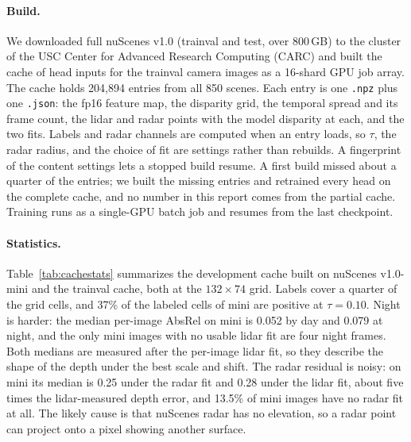\paragraph{Build.} We downloaded full nuScenes v1.0 (trainval and test, over 800\,GB) to the cluster of the USC Center for Advanced Research Computing (CARC) and built the cache of head inputs for the trainval camera images as a 16-shard GPU job array. The cache holds 204,894 entries from all 850 scenes. Each entry is one \texttt{.npz} plus one \texttt{.json}: the fp16 feature map, the disparity grid, the temporal spread and its frame count, the lidar and radar points with the model disparity at each, and the two fits. Labels and radar channels are computed when an entry loads, so $\tau$, the radar radius, and the choice of fit are settings rather than rebuilds. A fingerprint of the content settings lets a stopped build resume. A first build missed about a quarter of the entries; we built the missing entries and retrained every head on the complete cache, and no number in this report comes from the partial cache.  Training runs as a single-GPU batch job and resumes from the last checkpoint.

\paragraph{Statistics.} Table~\ref{tab:cachestats} summarizes the development cache built on nuScenes v1.0-mini and the trainval cache, both at the $132 \times 74$ grid. Labels cover a quarter of the grid cells, and 37\% of the labeled cells of mini are positive at $\tau = 0.10$. Night is harder: the median per-image AbsRel on mini is 0.052 by day and 0.079 at night, and the only mini images with no usable lidar fit are four night frames. Both medians are measured after the per-image lidar fit, so they describe the shape of the depth under the best scale and shift. The radar residual is noisy: on mini its median is 0.25 under the radar fit and 0.28 under the lidar fit, about five times the lidar-measured depth error, and 13.5\% of mini images have no radar fit at all. The likely cause is that nuScenes radar has no elevation, so a radar point can project onto a pixel showing another surface.

